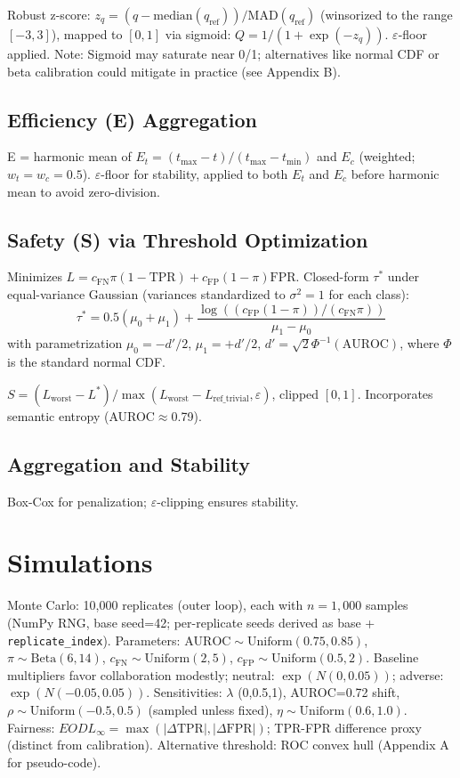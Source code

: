 \documentclass[a4paper]{article}
\begin{document}
Robust z-score: $z_q = (q - \text{median}(q_{\text{ref}})) / \text{MAD}(q_{\text{ref}})$ (winsorized to the range $[-3,3]$), mapped to $[0,1]$ via sigmoid: $Q = 1 / (1 + \exp(-z_q))$. $\varepsilon$-floor applied. Note: Sigmoid may saturate near 0/1; alternatives like normal CDF or beta calibration could mitigate in practice (see Appendix B).

\subsection{Efficiency (E) Aggregation}

E = harmonic mean of $E_t = (t_{\max} - t)/(t_{\max} - t_{\min})$ and $E_c$ (weighted; $w_t=w_c=0.5$). $\varepsilon$-floor for stability, applied to both $E_t$ and $E_c$ before harmonic mean to avoid zero-division.

\subsection{Safety (S) via Threshold Optimization}

Minimizes $L = c_{\text{FN}} \pi (1-\text{TPR}) + c_{\text{FP}} (1-\pi) \text{FPR}$. Closed-form $\tau^*$ under equal-variance Gaussian (variances standardized to $\sigma^2=1$ for each class): 
\[
\tau^* = 0.5 (\mu_0 + \mu_1) + \frac{\log((c_{\text{FP}} (1-\pi)) / (c_{\text{FN}} \pi))}{\mu_1 - \mu_0}
\]
with parametrization $\mu_0 = -d'/2$, $\mu_1 = +d'/2$, $d' = \sqrt{2} \Phi^{-1}(\text{AUROC})$, where $\Phi$ is the standard normal CDF.

$S = (L_{\text{worst}} - L^*) / \max(L_{\text{worst}} - L_{\text{ref\_trivial}}, \varepsilon)$, clipped $[0,1]$. Incorporates semantic entropy (AUROC$\approx$0.79).

\subsection{Aggregation and Stability}

Box-Cox for penalization; $\varepsilon$-clipping ensures stability.

\section{Simulations}

Monte Carlo: 10,000 replicates (outer loop), each with $n=1,000$ samples (NumPy RNG, base seed=42; per-replicate seeds derived as base + \texttt{replicate\_index}). Parameters: $\text{AUROC} \sim \text{Uniform}(0.75,0.85)$, $\pi \sim \text{Beta}(6,14)$, $c_{\text{FN}} \sim \text{Uniform}(2,5)$, $c_{\text{FP}} \sim \text{Uniform}(0.5,2)$. Baseline multipliers favor collaboration modestly; neutral: $\exp(N(0,0.05))$; adverse: $\exp(N(-0.05,0.05))$. Sensitivities: $\lambda$ (0,0.5,1), AUROC=0.72 shift, $\rho \sim \text{Uniform}(-0.5,0.5)$ (sampled unless fixed), $\eta \sim \text{Uniform}(0.6,1.0)$. Fairness: $EOD L_\infty = \max(|\Delta\text{TPR}|, |\Delta\text{FPR}|)$; TPR-FPR difference proxy (distinct from calibration). Alternative threshold: ROC convex hull (Appendix A for pseudo-code).
\end{document}
